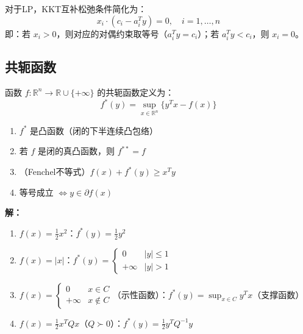 \begin{notebox}[互补松弛条件（LP）]
对于LP，KKT互补松弛条件简化为：
\[
x_i \cdot (c_i - a_i^T y) = 0, \quad i = 1, \ldots, n
\]
即：若 $x_i > 0$，则对应的对偶约束取等号（$a_i^T y = c_i$）；若 $a_i^T y < c_i$，则 $x_i = 0$。
\end{notebox}

\subsection{共轭函数}

\begin{definition}[Fenchel共轭函数]
函数 $f: \mathbb{R}^n \to \mathbb{R} \cup \{+\infty\}$ 的共轭函数定义为：
\[
f^*(y) = \sup_{x \in \mathbb{R}^n} \{y^T x - f(x)\}
\]
\end{definition}

\begin{theorem}[共轭函数的性质]
\begin{enumerate}
    \item $f^*$ 是凸函数（闭的下半连续凸包络）
    \item 若 $f$ 是闭的真凸函数，则 $f^{**} = f$
    \item （Fenchel不等式）$f(x) + f^*(y) \geq x^T y$
    \item 等号成立 $\Leftrightarrow y \in \partial f(x)$
\end{enumerate}
\end{theorem}

\begin{example}[常见共轭函数]
\textbf{解：}

\begin{enumerate}
    \item $f(x) = \frac{1}{2}x^2$：$f^*(y) = \frac{1}{2}y^2$
    \item $f(x) = |x|$：$f^*(y) = \begin{cases} 0 & |y| \leq 1 \\ +\infty & |y| > 1 \end{cases}$
    \item $f(x) = \begin{cases} 0 & x \in C \\ +\infty & x \notin C \end{cases}$（示性函数）：$f^*(y) = \sup_{x \in C} y^T x$（支撑函数）
    \item $f(x) = \frac{1}{2}x^T Q x$（$Q \succ 0$）：$f^*(y) = \frac{1}{2}y^T Q^{-1} y$
\end{enumerate}
\end{example}

